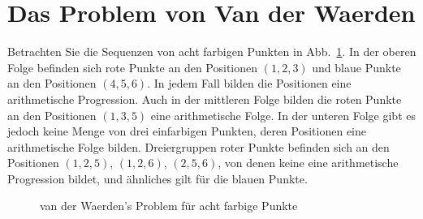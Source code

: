 
\section{Das Problem von Van der Waerden}\label{s.van}

Betrachten Sie die Sequenzen von acht farbigen Punkten in Abb.~\ref{f.vdw1}. In der oberen Folge befinden sich rote Punkte an den Positionen $(1,2,3)$ und blaue Punkte an den Positionen $(4,5,6)$. In jedem Fall bilden die Positionen eine arithmetische Progression. Auch in der mittleren Folge bilden die roten Punkte an den Positionen $(1,3,5)$ eine arithmetische Folge. In der unteren Folge gibt es jedoch keine Menge von drei einfarbigen Punkten, deren Positionen eine arithmetische Folge bilden. 
Dreiergruppen roter Punkte befinden sich an den Positionen $(1,2,5)$, $(1,2,6)$, $(2,5,6)$, von denen keine eine arithmetische Progression bildet, und ähnliches gilt für die blauen Punkte.

\begin{figure}[htb]
\begin{center}
\end{center}
\caption{van der Waerden's Problem für acht farbige Punkte}\label{f.vdw1}
\end{figure}

